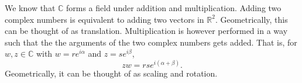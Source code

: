 \documentclass[a4paper, openany]{memoir}
\theoremstyle{definition}
\theoremstyle{plain}
\newtheorem{lemma}[definition]{Lemma}
\newtheorem{proposition}[definition]{Proposition}
\begin{document}
We know that $\mathbb{C}$ forms a field under addition and multiplication. Adding two complex numbers is equivalent to adding two vectors in $\mathbb{R}^2$. Geometrically, this can be thought of as translation. Multiplication is however performed in a way such that the the arguments of the two complex numbers gets added. That is, for $w, z \in \mathbb{C}$ with $w = re^{i \alpha}$ and $z = se^{i \beta}$,
\[zw = rse^{i (\alpha + \beta)}.\]
Geometrically, it can be thought of as scaling and rotation.

\newpage
\end{document}
